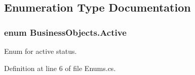 \subsection{Enumeration Type Documentation}
\subsubsection[{\texorpdfstring{Active}{Active}}]{\setlength{\rightskip}{0pt plus 5cm}enum {\bf Business\+Objects.\+Active}\hspace{0.3cm}{\ttfamily [strong]}}\hypertarget{namespace_business_objects_a640a4d136931381578aad0a180173cfc}{}\label{namespace_business_objects_a640a4d136931381578aad0a180173cfc}


Enum for active status. 



Definition at line 6 of file Enums.\+cs.

